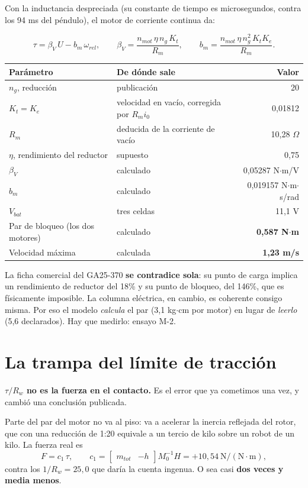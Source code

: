 \documentclass[11pt,a4paper]{report}
\begin{document}
Con la inductancia despreciada (su constante de tiempo es microsegundos, contra los 94 ms del
péndulo), el motor de corriente continua da:

\begin{equation}
\tau = \beta_V\,U - b_m\,\omega_{rel},
\qquad
\beta_V = \frac{n_{mot}\,\eta\,n_g\,K_t}{R_m},
\qquad
b_m = \frac{n_{mot}\,\eta\,n_g^2\,K_t K_e}{R_m}.
\end{equation}

\begin{center}
\begin{tabular}{@{}llr@{}}
\toprule
\textbf{Parámetro} & \textbf{De dónde sale} & \textbf{Valor} \\
\midrule
$n_g$, reducción & publicación & 20 \\
$K_t = K_e$ & velocidad en vacío, corregida por $R_m i_0$ & 0{,}01812 \\
$R_m$ & \textcolor{naranjap}{deducida} de la corriente de vacío & 10{,}28 $\Omega$ \\
$\eta$, rendimiento del reductor & \textcolor{rojop}{supuesto} & 0{,}75 \\
$\beta_V$ & calculado & 0{,}05287 N$\cdot$m/V \\
$b_m$ & calculado & 0{,}019157 N$\cdot$m$\cdot$s/rad \\
$V_{bat}$ & tres celdas & 11{,}1 V \\
\midrule
Par de bloqueo (los dos motores) & calculado & \textbf{0{,}587 N$\cdot$m} \\
Velocidad máxima & calculada & \textbf{1{,}23 m/s} \\
\bottomrule
\end{tabular}
\end{center}

\begin{ojo}
La ficha comercial del GA25-370 \textbf{se contradice sola}: su punto de carga implica un
rendimiento de reductor del 18\% y su punto de bloqueo, del 146\%, que es físicamente
imposible. La columna eléctrica, en cambio, es coherente consigo misma. Por eso el modelo
\emph{calcula} el par (3{,}1 kg$\cdot$cm por motor) en lugar de \emph{leerlo} (5{,}6
declarados). Hay que medirlo: ensayo M-2.
\end{ojo}

\section{La trampa del límite de tracción}

\begin{ojo}
\textbf{$\tau/R_w$ no es la fuerza en el contacto.} Es el error que ya cometimos una vez, y
cambió una conclusión publicada.

Parte del par del motor no va al piso: va a acelerar la inercia reflejada del rotor, que con
una reducción de 1:20 equivale a un tercio de kilo sobre un robot de un kilo. La fuerza real es
\[
F = c_1\,\tau, \qquad c_1 = \begin{bmatrix} m_{tot} & -h\end{bmatrix} M_0^{-1} H
= +10{,}54 \ \mathrm{N/(N\cdot m)},
\]
contra los $1/R_w = 25{,}0$ que daría la cuenta ingenua. O sea casi \textbf{dos veces y media menos}.
\end{ojo}
\end{document}

